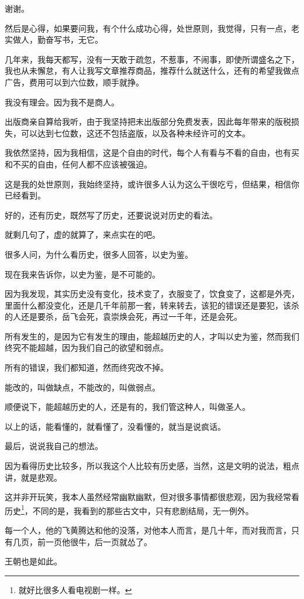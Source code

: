 \begin{multicols}{\theparacolNo}
谢谢。

然后是心得，如果要问我，有个什么成功心得，处世原则，我觉得，只有一点，老实做人，勤奋写书，无它。

几年来，我每天都写，没有一天敢于疏忽，不惹事，不闹事，即使所谓盛名之下，我也从未懈怠，有人让我写文章推荐商品，推荐什么就送什么，还有的希望我做点广告，费用可以到六位数，顺手就挣。

我没有理会。因为我不是商人。

出版商亲自算给我听，由于我坚持把未出版部分免费发表，因此每年带来的版税损失，可以达到七位数，这还不包括盗版，以及各种未经许可的文本。

我依然坚持，因为我相信，这是个自由的时代，每个人有看与不看的自由，也有买和不买的自由，任何人都不应该被强迫。

这是我的处世原则，我始终坚持，或许很多人认为这么干很吃亏，但结果，相信你已经看到。

好的，还有历史，既然写了历史，还要说说对历史的看法。

就剩几句了，虚的就算了，来点实在的吧。

很多人问，为什么看历史，很多人回答，以史为鉴。

现在我来告诉你，以史为鉴，是不可能的。

因为我发现，其实历史没有变化，技术变了，衣服变了，饮食变了，这都是外壳，里面什么都没变化，还是几千年前那一套，转来转去，该犯的错误还是要犯，该杀的人还是要杀，岳飞会死，袁崇焕会死，再过一千年，还是会死。

所有发生的，是因为它有发生的理由，能超越历史的人，才叫以史为鉴，然而我们终究不能超越，因为我们自己的欲望和弱点。

所有的错误，我们都知道，然而终究改不掉。

能改的，叫做缺点，不能改的，叫做弱点。

顺便说下，能超越历史的人，还是有的，我们管这种人，叫做圣人。

以上的话，能看懂的，就看懂了，没看懂的，就当是说疯话。

最后，说说我自己的想法。

因为看得历史比较多，所以我这个人比较有历史感，当然，这是文明的说法，粗点讲，就是悲观。

这并非开玩笑，我本人虽然经常幽默幽默，但对很多事情都很悲观，因为我经常看历史\footnote{就好比很多人看电视剧一样。}，不同的是，我看到的那些古文中，只有悲剧结局，无一例外。

每一个人，他的飞黄腾达和他的没落，对他本人而言，是几十年，而对我而言，只有几页，前一页他很牛，后一页就怂了。

王朝也是如此。


\end{multicols}
